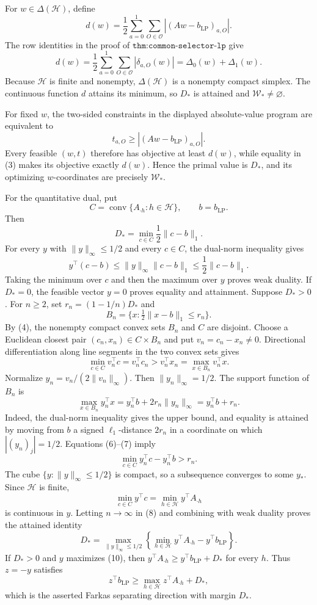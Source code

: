 For \(w\in\Delta(\mathcal H)\), define
\[
d(w)=\frac12\sum_{a=0}^1\sum_{O\in\mathcal O}|(Aw-b_{\mathrm{LP}})_{a,O}|.
\tag{1}
\]
The row identities in the proof of \(\texttt{thm:common-selector-lp}\) give
\[
d(w)=\frac12\sum_{a=0}^1\sum_{O\in\mathcal O}|\delta_{a,O}(w)|=\Delta_0(w)+\Delta_1(w).
\tag{2}
\]
Because \(\mathcal H\) is finite and nonempty, \(\Delta(\mathcal H)\) is a nonempty compact simplex. The continuous function \(d\) attains its minimum, so \(D_*\) is attained and \(\mathcal W_*\ne\varnothing\).

For fixed \(w\), the two-sided constraints in the displayed absolute-value program are equivalent to
\[
t_{a,O}\ge |(Aw-b_{\mathrm{LP}})_{a,O}|.
\tag{3}
\]
Every feasible \((w,t)\) therefore has objective at least \(d(w)\), while equality in (3) makes its objective exactly \(d(w)\). Hence the primal value is \(D_*\), and its optimizing \(w\)-coordinates are precisely \(\mathcal W_*\).

For the quantitative dual, put
\[
C=\operatorname{conv}\{A_{\cdot h}:h\in\mathcal H\},\qquad b=b_{\mathrm{LP}}.
\]
Then
\[
D_*=\min_{c\in C}\frac12\lVert c-b\rVert_1.
\tag{4}
\]
For every \(y\) with \(\lVert y\rVert_\infty\le1/2\) and every \(c\in C\), the dual-norm inequality gives
\[
y^\top(c-b)\le\lVert y\rVert_\infty\lVert c-b\rVert_1\le\frac12\lVert c-b\rVert_1.
\tag{5}
\]
Taking the minimum over \(c\) and then the maximum over \(y\) proves weak duality. If \(D_*=0\), the feasible vector \(y=0\) proves equality and attainment. Suppose \(D_*>0\). For \(n\ge2\), set \(r_n=(1-1/n)D_*\) and
\[
B_n=\{x:\tfrac12\lVert x-b\rVert_1\le r_n\}.
\]
By (4), the nonempty compact convex sets \(B_n\) and \(C\) are disjoint. Choose a Euclidean closest pair \((c_n,x_n)\in C\times B_n\) and put \(v_n=c_n-x_n\ne0\). Directional differentiation along line segments in the two convex sets gives
\[
\min_{c\in C}v_n^\top c=v_n^\top c_n>v_n^\top x_n=\max_{x\in B_n}v_n^\top x.
\tag{6}
\]
Normalize \(y_n=v_n/(2\lVert v_n\rVert_\infty)\). Then \(\lVert y_n\rVert_\infty=1/2\). The support function of \(B_n\) is
\[
\max_{x\in B_n}y_n^\top x=y_n^\top b+2r_n\lVert y_n\rVert_\infty=y_n^\top b+r_n.
\tag{7}
\]
Indeed, the dual-norm inequality gives the upper bound, and equality is attained by moving from \(b\) a signed \(\ell_1\)-distance \(2r_n\) in a coordinate on which \(|(y_n)_j|=1/2\). Equations (6)--(7) imply
\[
\min_{c\in C}y_n^\top c-y_n^\top b>r_n.
\tag{8}
\]
The cube \(\{y:\lVert y\rVert_\infty\le1/2\}\) is compact, so a subsequence converges to some \(y_*\). Since \(\mathcal H\) is finite,
\[
\min_{c\in C}y^\top c=\min_{h\in\mathcal H}y^\top A_{\cdot h}
\tag{9}
\]
is continuous in \(y\). Letting \(n\to\infty\) in (8) and combining with weak duality proves the attained identity
\[
D_*=\max_{\lVert y\rVert_\infty\le1/2}\left\{\min_{h\in\mathcal H}y^\top A_{\cdot h}-y^\top b_{\mathrm{LP}}\right\}.
\tag{10}
\]
If \(D_*>0\) and \(y\) maximizes (10), then \(y^\top A_{\cdot h}\ge y^\top b_{\mathrm{LP}}+D_*\) for every \(h\). Thus \(z=-y\) satisfies
\[
z^\top b_{\mathrm{LP}}\ge\max_{h\in\mathcal H}z^\top A_{\cdot h}+D_*,
\tag{11}
\]
which is the asserted Farkas separating direction with margin \(D_*\).

